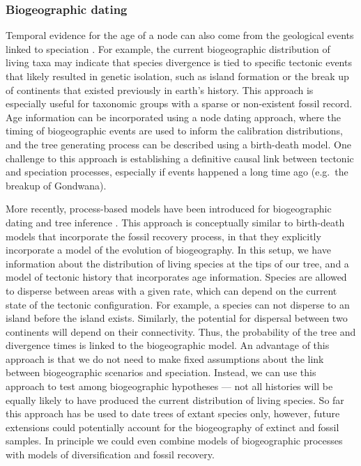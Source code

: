 
\subsubsection{Biogeographic dating}

Temporal evidence for the age of a node can also come from the geological events linked to speciation \citep{Ho2015,deBaets2016}.
For example, the current biogeographic distribution of living taxa may indicate that species divergence is tied to specific tectonic events that likely resulted in genetic isolation, such as island formation or the break up of continents that existed previously in earth's history.
This approach is especially useful for taxonomic groups with a sparse or non-existent fossil record.
Age information can be incorporated using a node dating approach, where the timing of biogeographic events are used to inform the calibration distributions, and the tree generating process can be described using a birth-death model.
One challenge to this approach is establishing a definitive causal link between tectonic and speciation processes, especially if events happened a long time ago (e.g.\ the breakup of Gondwana).


More recently, process-based models have been introduced for biogeographic dating and tree inference \citep{Landis2016,Landis2019}.
This approach is conceptually similar to birth-death models that incorporate the fossil recovery process, in that they explicitly incorporate a model of the evolution of biogeography.
In this setup, we have information about the distribution of living species at the tips of our tree, and a model of tectonic history that incorporates age information. 
Species are allowed to disperse between areas with a given rate, which can depend on the current state of the tectonic configuration.
For example, a species can not disperse to an island before the island exists. 
Similarly, the potential for dispersal between two continents will depend on their connectivity.
Thus, the probability of the tree and divergence times is linked to the biogeographic model.
An advantage of this approach is that we do not need to make fixed assumptions about the link between biogeographic scenarios and speciation.
Instead, we can use this approach to test among biogeographic hypotheses --- not all histories will be equally likely to have produced the current distribution of living species.
So far this approach has be used to date trees of extant species only, however, future extensions could potentially account for the biogeography of extinct and fossil samples.
In principle we could even combine models of biogeographic processes with models of diversification and fossil recovery. 

